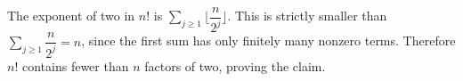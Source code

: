The exponent of two in $n!$ is $\sum_{j\ge1}\lfloor \dfrac{n}{2^j}\rfloor$. This is strictly smaller than $\sum_{j\ge1}\dfrac{n}{2^j}=n$, since the first sum has only finitely many nonzero terms. Therefore $n!$ contains fewer than $n$ factors of two, proving the claim.
